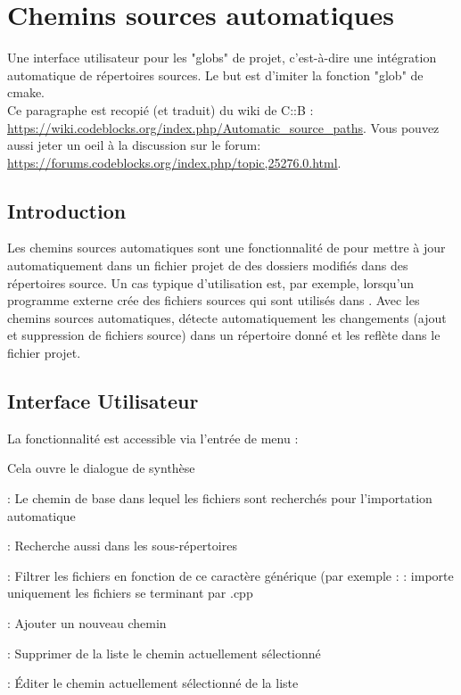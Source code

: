 \section{Chemins sources automatiques}\label{sec:automatic_source_paths}
Une interface utilisateur pour les "globs" de projet, c'est-à-dire une intégration automatique de répertoires sources. Le but est d'imiter la fonction "glob" de cmake.\\
Ce paragraphe est recopié (et traduit) du wiki de C::B : \url{https://wiki.codeblocks.org/index.php/Automatic_source_paths}.
Vous pouvez aussi jeter un oeil à la discussion sur le forum: \url{https://forums.codeblocks.org/index.php/topic,25276.0.html}.

\subsection{Introduction}
Les chemins sources automatiques sont une fonctionnalité de \codeblocks pour mettre à jour automatiquement dans un fichier projet de \codeblocks des dossiers modifiés dans des répertoires source. Un cas typique d'utilisation est, par exemple, lorsqu'un programme externe crée des fichiers sources qui sont utilisés dans \codeblocks. Avec les chemins sources automatiques, \codeblocks détecte automatiquement les changements (ajout et suppression de fichiers source) dans un répertoire donné et les reflète dans le fichier projet.
\subsection{Interface Utilisateur}
La fonctionnalité est accessible via l'entrée de menu  :


Cela ouvre le dialogue de synthèse

\begin{description}[noitemsep]
\item[Chemin]: Le chemin de base dans lequel les fichiers sont recherchés pour l'importation automatique
\item[Récursif]: Recherche aussi dans les sous-répertoires
\item[Joker]: Filtrer les fichiers en fonction de ce caractère générique (par exemple :  : importe uniquement les fichiers se terminant par .cpp
\item[Ajouter]: Ajouter un nouveau chemin
\item[Supprimer]: Supprimer de la liste le chemin actuellement sélectionné
\item[Édition]: Éditer le chemin actuellement sélectionné de la liste 
\end{description}

